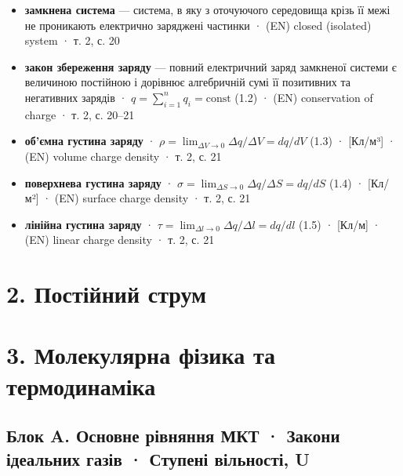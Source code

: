 \documentclass[11pt,a4paper,oneside]{book}
\newcommand{\book}{}
\begin{document}
\begin{itemize}
\item \textbf{замкнена система} — система, в яку з оточуючого середовища крізь її межі не проникають електрично заряджені частинки · (EN) closed (isolated) system · \book{} т. 2, с. 20
\item \textbf{закон збереження заряду} — повний електричний заряд замкненої системи є величиною постійною і дорівнює алгебричній сумі її позитивних та негативних зарядів · $q = \sum_{i=1}^{n} q_i = \text{const}$ (1.2) · (EN) conservation of charge · \book{} т. 2, с. 20–21
\item \textbf{об'ємна густина заряду} · $\rho = \lim_{\Delta V\to0} \Delta q/\Delta V = dq/dV$ (1.3) · [Кл/м³] · (EN) volume charge density · \book{} т. 2, с. 21
\item \textbf{поверхнева густина заряду} · $\sigma = \lim_{\Delta S\to0} \Delta q/\Delta S = dq/dS$ (1.4) · [Кл/м²] · (EN) surface charge density · \book{} т. 2, с. 21
\item \textbf{лінійна густина заряду} · $\tau = \lim_{\Delta l\to0} \Delta q/\Delta l = dq/dl$ (1.5) · [Кл/м] · (EN) linear charge density · \book{} т. 2, с. 21
\end{itemize}

\section*{2. Постійний струм}

\section*{3. Молекулярна фізика та термодинаміка}

\subsection*{Блок A. Основне рівняння МКТ · Закони ідеальних газів · Ступені вільності, U}
\end{document}
